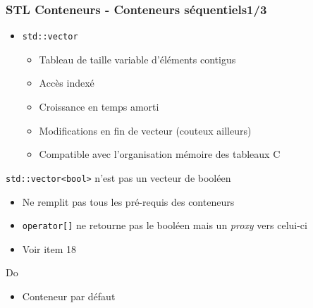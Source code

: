 \documentclass[C++.tex]{subfiles}
\begin{document}
\begin{frame}[fragile]
	\frametitle{STL Conteneurs - Conteneurs séquentiels\titlehfill{}1/3}
	\begin{itemize}
		\item \lstinline|std::vector|
		\begin{itemize}
			\item Tableau de taille variable d'éléments contigus
			\item Accès indexé
			\item Croissance en temps amorti
			\item Modifications en fin de vecteur (couteux ailleurs)


			\item Compatible avec l'organisation mémoire des tableaux C


		\end{itemize}
	\end{itemize}

	\begin{alertblock}{\lstinline|std::vector<bool>| n'est pas un vecteur de booléen}
		\begin{itemize}
			\item Ne remplit pas tous les pré-requis des conteneurs
			\item \lstinline|operator[]| ne retourne pas le booléen mais un \textit{proxy} vers celui-ci
			\item Voir \cite{effStl} item 18


		\end{itemize}
	\end{alertblock}

	\begin{exampleblock}{Do}
		\begin{itemize}
			\item Conteneur par défaut
		\end{itemize}
	\end{exampleblock}
\end{frame}
\end{document}
